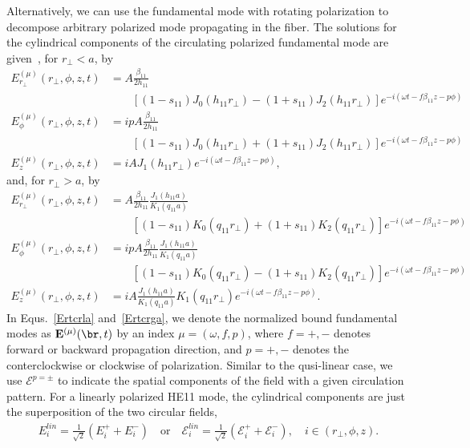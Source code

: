 \documentclass[]{report}
\begin{document}
Alternatively, we can use the fundamental mode with rotating polarization to decompose arbitrary polarized mode propagating in the fiber. The solutions for the cylindrical components of the circulating polarized fundamental mode are given~\cite{Lacroute2012,Vetsch2010a}, for $ r_\perp<a $, by
\begin{subequations}
\label{Ertcrla}
\begin{align}
E^{(\mu)}_{r_\perp}(r_\perp,\phi,z,t) &=A\frac{\beta_{11}}{2h_{11}}\nonumber\\
&\qquad \left[ (1-s_{11})J_0(h_{11}r_\perp)-(1+s_{11})J_2(h_{11}r_\perp) \right]e^{-i(\omega t-f\beta_{11} z -p\phi)}\\
E^{(\mu)}_\phi(r_\perp,\phi,z,t) &=  ipA \frac{\beta_{11}}{2h_{11}} \nonumber\\
&\qquad \left[ (1-s_{11})J_0(h_{11}r_\perp) +(1+s_{11})J_2(h_{11}r_\perp) \right] e^{-i(\omega t-f\beta_{11} z -p\phi)}\\
E^{(\mu)}_z(r_\perp,\phi,z,t) &= iA J_1(h_{11}r_\perp) e^{-i(\omega t-f\beta_{11} z -p\phi)},
\end{align}
\end{subequations}
and, for $ r_\perp>a $, by
\begin{subequations}
\label{Ertcrga}
\begin{align}
E^{(\mu)}_{r_\perp}(r_\perp,\phi,z,t) &=A\frac{\beta_{11}}{2h_{11}}\frac{J_1(h_{11}a)}{K_1(q_{11}a)}\nonumber\\ 
&\qquad \left[ (1-s_{11})K_0(q_{11}r_\perp)+(1+s_{11})K_2(q_{11}r_\perp) \right]e^{-i(\omega t-f\beta_{11} z -p\phi)}\\
E^{(\mu)}_\phi(r_\perp,\phi,z,t) &=  ipA \frac{\beta_{11}}{2h_{11}} \frac{J_1(h_{11}a)}{K_1(q_{11}a)}\nonumber\\ 
&\qquad \left[ (1-s_{11})K_0(q_{11}r_\perp) - (1+s_{11})K_2(q_{11}r_\perp) \right] e^{-i(\omega t-f\beta_{11} z -p\phi)}\\
E^{(\mu)}_z(r_\perp,\phi,z,t) &= iA \frac{J_1(h_{11}a)}{K_1(q_{11}a)} K_1(q_{11}r_\perp) e^{-i(\omega t-f\beta_{11} z -p\phi)}.
\end{align}
\end{subequations}
In Equs.~\ref{Ertcrla} and~\ref{Ertcrga}, we denote the normalized bound fundamental modes as $ \mathbf{E}^{(\mu)} (\br,t)$ by an index $ \mu=(\omega,f,p) $, where $ f=+,- $ denotes forward or backward propagation direction, and $ p=+,- $ denotes the conterclockwise or clockwise of polarization. Similar to the qusi-linear case, we use $ \boldsymbol{\mathcal{E}}^{p=\pm} $ to indicate the spatial components of the field with a given circulation pattern. For a linearly polarized HE11 mode, the cylindrical components are just the superposition of the two circular fields, 
\begin{align}\label{Eilincyc}
E_i^{lin} = \frac{1}{\sqrt{2}}(E_i^+ + E_i^-)\quad \mathrm{or}\quad \mathcal{E}_i^{lin} = \frac{1}{\sqrt{2}}(\mathcal{E}_i^+ + \mathcal{E}_i^-),\quad i\in(r_\perp,\phi,z).
\end{align}
\end{document}
